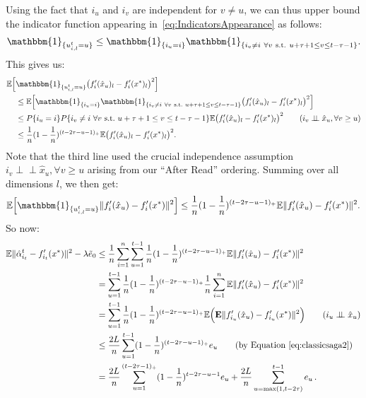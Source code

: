 \documentclass[twoside, 11pt]{article}
\newcommand{\overlap}{\tau}
\newcommand{\lipschitz}{L}
\newcommand{\E}{\mathbb{E}}
\newcommand{\Econd}{\mathbf{E}}
\newcommand{\ind}{\mathbbm{1}}
\begin{document}
Using the fact that $i_u$ and $i_v$ are independent for $v \neq u$, we can thus upper bound the indicator function appearing in~\eqref{eq:IndicatorsAppearance} as follows:
\begin{align}\label{eq:indicatrices}
\ind_{\{u_{i,l}^t = u\}}
\leq \ind_{\{i_u=i\}}
	 \ind_{\{i_v \neq i\ \forall v\ \text{s.t.}\ u+\overlap+1 \leq v \leq t-\overlap-1\}} .
\end{align}
This gives us:
\begin{align}
\E \Big[ &\ind_{\{u_{i,l}^t = u\}} \big(f'_i(\hat x_u)_l-f'_i(x^*)_l\big)^2 \Big]
\nonumber \\
&\leq \E \Big[\ind_{\{i_u=i\}}
	\ind_{\{i_v \neq i\ \forall v\ \text{s.t.}\ u+\overlap+1 \leq v \leq t-\overlap-1\}} \big(f'_i(\hat x_u)_l-f'_i(x^*)_l\big)^2\Big]
\nonumber \\
&\leq P\{i_u=i\}
	P\{i_v \neq i\ \forall v\ \text{s.t.}\ u+\overlap+1 \leq v \leq t-\overlap-1\}
	\E\big(f'_i(\hat x_u)_l-f'_i(x^*)_l\big)^2
\tag*{($i_v \perp\!\!\! \perp \hat x_u, \forall v \geq u$)} \nonumber \\
&\leq \frac{1}{n}(1 - \frac{1}{n})^{(t-2\overlap-u -1)_+}
	\E\big(f'_i(\hat x_u)_l-f'_i(x^*)_l\big)^2 .
\end{align}
Note that the third line used the crucial independence assumption $i_v \perp\!\!\! \perp \hat x_u, \forall v \geq u$ arising from our ``After Read'' ordering.
Summing over all dimensions $l$, we then get:
\begin{align}
\E \Big[ \ind_{\{u_{i,l}^t = u\}} \|f'_i(\hat x_u)-f'_i(x^*)\|^2 \Big]
\leq \frac{1}{n}(1 - \frac{1}{n})^{(t-2\overlap-u-1)_+}
	\E \|f'_i(\hat x_u)-f'_i(x^*)\|^2 .
\end{align}
So now:
\begin{align}
\E \|\hat \alpha_{i_t}^t - f'_{i_t}(x^*)\|^2 - \lambda \tilde e_0
&\leq \frac{1}{n}\sum_{i=1}^n \sum_{u=1}^{t-1} \frac{1}{n}(1 - \frac{1}{n})^{(t-2\overlap-u-1)_+} \E \|f'_i(\hat x_{u}) - f'_i(x^*)\|^2
\nonumber \\
&= \sum_{u=1}^{t-1} \frac{1}{n}(1 - \frac{1}{n})^{(t-2\overlap-u -1)_+} \frac{1}{n}\sum_{i=1}^n \E \|f'_i(\hat x_{u}) - f'_i(x^*)\|^2
\nonumber \\
&= \sum_{u=1}^{t-1} \frac{1}{n}(1 - \frac{1}{n})^{(t-2\overlap-u -1)_+} \E \Big(\Econd \|f'_{i_u}(\hat x_{u}) - f'_{i_u}(x^*)\|^2 \Big)
\tag*{($i_u \perp\!\!\!\perp \hat x_u$)} \nonumber \\
&\leq \frac{2\lipschitz}{n} \sum_{u=1}^{t-1} (1 - \frac{1}{n})^{(t-2\overlap-u -1)_+} e_u
\tag*{(by Equation~\ref{eq:classicsaga2})} \nonumber \\
&= \frac{2\lipschitz}{n} \sum_{u=1}^{(t-2\overlap -1)_+} (1 - \frac{1}{n})^{t-2\overlap-u -1} e_u
	+ \frac{2\lipschitz}{n} \sum_{u=\max(1, t-2\overlap)}^{t-1} e_u  \, .\label{eq:51}
\end{align}
\end{document}
